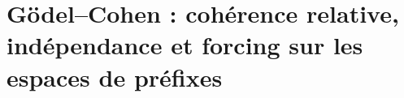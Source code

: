 \HMTFlushCurrentChapter
\chapter{Gödel--Cohen : cohérence relative, indépendance et forcing sur les espaces de préfixes}%
\begingroup
\renewcommand{\chapter}[2][]{}%
%
\endgroup

\HMTFlushCurrentChapter
\chapter{Système opératoire d'Euler en HMT : défaut somme--produit, géométries exponentielles triadiques, Principe d'Ambivalence et double projection}













\HMTFlushCurrentChapter
